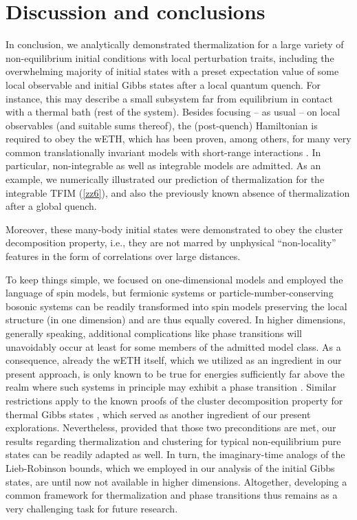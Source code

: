 \documentclass[twocolumn,aps,prb,floatfix,superscriptaddress]{revtex4-2}
\newcommand{\<}{\left\langle}	%
\renewcommand{\>}{\right\rangle}	%
\begin{document}
\section{Discussion and conclusions}
\label{sec:Discussion}

In conclusion,
we analytically demonstrated thermalization
for a large variety of non-equilibrium initial conditions with
local perturbation traits, including the overwhelming 
majority of initial states with a preset expectation value of 
some local observable and initial Gibbs states after a local 
quantum quench.
For instance, this may describe a small subsystem
far from equilibrium in contact with a thermal bath
(rest of the system).
Besides focusing -- as usual -- on local observables (and suitable sums thereof),
the (post-quench) Hamiltonian is required to obey the wETH, 
which
has been proven,
among others, for many very common
translationally invariant models with short-range interactions
\cite{bir10,mor16,iyo17,mor18,kuw20,kuw20a}.
In particular, non-integrable as well as integrable models are admitted.
As an example, we numerically illustrated our prediction of 
thermalization for the integrable TFIM (\ref{zz6}), 
and also the previously known absence of 
thermalization after a global quench.

Moreover, these many-body initial states were demonstrated 
to obey the cluster decomposition property, i.e., 
they 
are not marred by
unphysical ``non-locality'' features in the form of
correlations  over large distances.

To keep things simple, we focused on one-dimensional models
and employed the language of spin models,
but fermionic systems or particle-number-conserving 
bosonic systems can be readily transformed into spin models preserving the local 
structure (in one dimension)
and are thus equally covered.
In higher dimensions, generally speaking, additional 
complications like phase transitions will unavoidably
occur at least for some members of the admitted model class.
As a consequence, already the wETH itself,
which we utilized as an ingredient in our present
approach, is only known to be true for energies sufficiently 
far above the realm where such systems in principle may 
exhibit a phase transition 
\cite{bir10,mor16,iyo17,mor18,kuw20,kuw20a}.
Similar restrictions apply to the known proofs of the
cluster decomposition property for thermal Gibbs 
states  \cite{ara69,par82,par95,kli14,fro15}, 
which served as another ingredient of our present explorations.
Nevertheless, provided that those two preconditions are met,
our results regarding thermalization and clustering for typical 
non-equilibrium pure states can be readily adapted as well.
In turn, the imaginary-time analogs of the Lieb-Robinson 
bounds, which we employed in our analysis of the
initial Gibbs states, are until now not available in higher 
dimensions.
Altogether, developing a common framework for
thermalization and phase transitions thus remains
as a very challenging task for future research.
\end{document}
